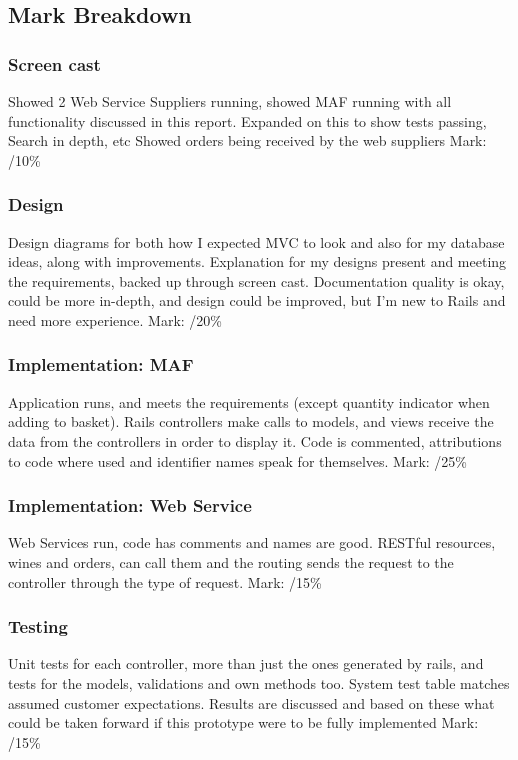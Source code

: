 \documentclass[12pt]{article}
\begin{document}
\subsection{Mark Breakdown}
\subsubsection{Screen cast}
Showed 2 Web Service Suppliers running, showed MAF running with all functionality discussed in this report. Expanded on this to show tests passing, Search in depth, etc Showed orders being received by the web suppliers
Mark: /10\%

\subsubsection{Design}
Design diagrams for both how I expected MVC to look and also for my database ideas, along with improvements. Explanation for my designs present and meeting the requirements, backed up through screen cast. Documentation quality is okay, could be more in-depth, and design could be improved, but I'm new to Rails and need more experience.
Mark: /20\%

\subsubsection{Implementation: MAF}
Application runs, and meets the requirements (except quantity indicator when adding to basket). Rails controllers make calls to models, and views receive the data from the controllers in order to display it. Code is commented, attributions to code where used and identifier names speak for themselves.
Mark: /25\%

\subsubsection{Implementation: Web Service}
Web Services run, code has comments and names are good. RESTful resources, wines and orders, can call them and the routing sends the request to the controller through the type of request.
Mark: /15\%

\subsubsection{Testing}
Unit tests for each controller, more than just the ones generated by rails, and tests for the models, validations and own methods too. System test table matches assumed customer expectations. Results are discussed and based on these what could be taken forward if this prototype were to be fully implemented
Mark: /15\%
\end{document}
